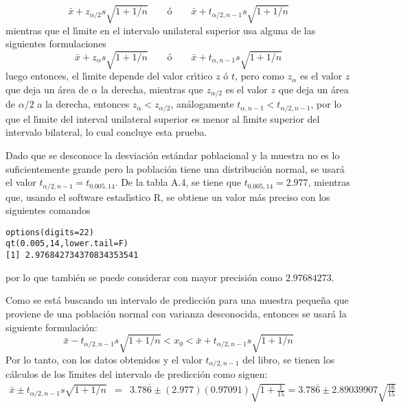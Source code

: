 \begin{solucion}
 \begin{equation*}
  \bar{x} + z_{\alpha/2}s\sqrt{1+1/n} \qquad \text{\'o} \qquad \bar{x} + t_{\alpha/2,n-1}s\sqrt{1+1/n}
 \end{equation*}
 mientras que el l\'{\i}mite en el intervalo unilateral superior usa alguna de las siguientes formulaciones
 \begin{equation*}
  \bar{x} + z_{\alpha}s\sqrt{1+1/n} \qquad \text{\'o} \qquad \bar{x} + t_{\alpha,n-1}s\sqrt{1+1/n}
 \end{equation*}
 luego entonces, el l\'{\i}mite depende del valor cr\'{\i}tico $z$ \'o $t$, pero como $z_{\alpha}$ es el valor $z$ que deja un \'area de $\alpha$ la derecha, mientras que $z_{\alpha/2}$ es el valor $z$ que deja un \'area de $\alpha/2$ a la derecha, entonces $z_{\alpha} < z_{\alpha/2}$, an\'alogamente $t_{\alpha,n-1} < t_{\alpha/2,n-1}$, por lo que el l\'{\i}mite del interval unilateral superior es menor al l\'{\i}mite superior del intervalo bilateral, lo cual concluye esta prueba.
 \par 
 Dado que se desconoce la desviaci\'on est\'andar poblacional y la muestra no es lo suficientemente grande pero la poblaci\'on tiene una distribuci\'on normal, se usar\'a el valor $t_{\alpha/2,n-1} = t_{0.005,14}$. De la tabla A.4, se tiene que $t_{0.005,14} = 2.977$, mientras que, usando el software estad\'{\i}stico R, se obtiene un valor m\'as preciso con los siguientes comandos
 \begin{verbatim}
options(digits=22)
qt(0.005,14,lower.tail=F)
[1] 2.976842734370834353541
 \end{verbatim}
 \vspace{-0.5cm}
 por lo que tambi\'en se puede considerar con mayor precisi\'on como $2.97684273$.
 \par 
 Como se est\'a buscando un intervalo de predicci\'on para una muestra peque\~na que proviene de una poblaci\'on normal con varianza desconocida, entonces se usar\'a la siguiente formulaci\'on:
 \begin{equation*}
  \bar{x} - t_{\alpha/2,n-1}s\sqrt{1+1/n} < x_0 < \bar{x} + t_{\alpha/2,n-1}s\sqrt{1+1/n}
 \end{equation*}
 Por lo tanto, con los datos obtenidos y el valor $t_{\alpha/2,n-1}$ del libro, se tienen los c\'alculos de los l\'{\i}mites del intervalo de predicci\'on como siguen:
 \begin{eqnarray*}
  \bar{x} \pm t_{\alpha/2,n-1}s\sqrt{1+1/n} & = & 3.78\overline{6} \pm (2.977)(0.97091)\sqrt{1+\frac{1}{15}} = 3.78\overline{6} \pm 2.89039907\sqrt{\frac{16}{15}} \\

\end{eqnarray*}
\end{solucion}
